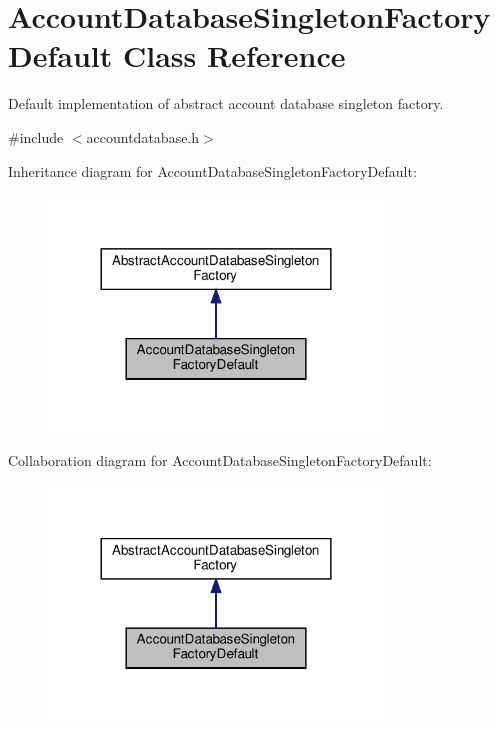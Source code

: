\hypertarget{classAccountDatabaseSingletonFactoryDefault}{}\section{Account\+Database\+Singleton\+Factory\+Default Class Reference}
\label{classAccountDatabaseSingletonFactoryDefault}


Default implementation of abstract account database singleton factory.  




{\ttfamily \#include $<$accountdatabase.\+h$>$}



Inheritance diagram for Account\+Database\+Singleton\+Factory\+Default\+:\nopagebreak
\begin{figure}[H]
\begin{center}
\leavevmode
\includegraphics[width=252pt]{d3/d4d/classAccountDatabaseSingletonFactoryDefault__inherit__graph}
\end{center}
\end{figure}


Collaboration diagram for Account\+Database\+Singleton\+Factory\+Default\+:\nopagebreak
\begin{figure}[H]
\begin{center}
\leavevmode
\includegraphics[width=252pt]{db/d2c/classAccountDatabaseSingletonFactoryDefault__coll__graph}
\end{center}
\end{figure}

